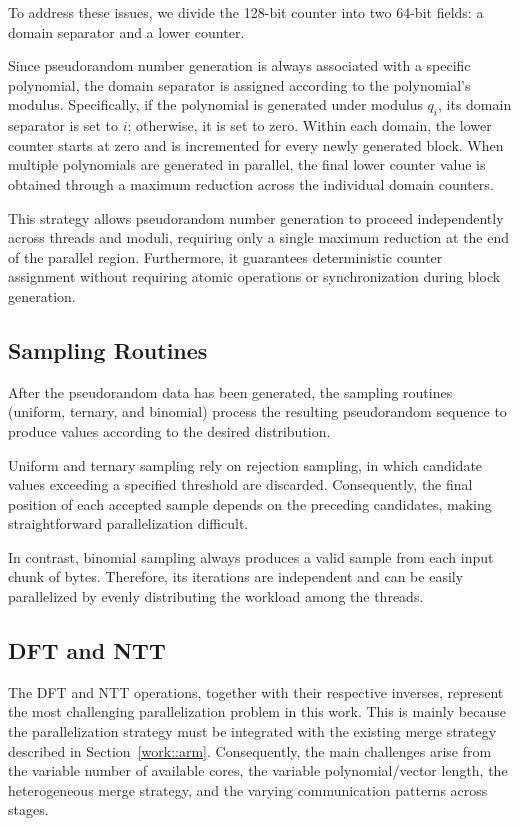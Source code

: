 To address these issues, we divide the 128-bit counter into two 64-bit fields: a domain separator and a lower counter.

Since pseudorandom number generation is always associated with a specific polynomial, the domain separator is assigned according to the polynomial's modulus. Specifically, if the polynomial is generated under modulus $q_i$, its domain separator is set to $i$; otherwise, it is set to zero. Within each domain, the lower counter starts at zero and is incremented for every newly generated block. When multiple polynomials are generated in parallel, the final lower counter value is obtained through a maximum reduction across the individual domain counters.

This strategy allows pseudorandom number generation to proceed independently across threads and moduli, requiring only a single maximum reduction at the end of the parallel region. Furthermore, it guarantees deterministic counter assignment without requiring atomic operations or synchronization during block generation.

\subsection{Sampling Routines}

After the pseudorandom data has been generated, the sampling routines (uniform, ternary, and binomial) process the resulting pseudorandom sequence to produce values according to the desired distribution.

Uniform and ternary sampling rely on rejection sampling, in which candidate values exceeding a specified threshold are discarded. Consequently, the final position of each accepted sample depends on the preceding candidates, making straightforward parallelization difficult.

In contrast, binomial sampling always produces a valid sample from each input chunk of bytes. Therefore, its iterations are independent and can be easily parallelized by evenly distributing the workload among the threads.

\subsection{DFT and NTT}

The DFT and NTT operations, together with their respective inverses, represent the most challenging parallelization problem in this work. This is mainly because the parallelization strategy must be integrated with the existing merge strategy described in Section~\ref{work::arm}. Consequently, the main challenges arise from the variable number of available cores, the variable polynomial/vector length, the heterogeneous merge strategy, and the varying communication patterns across stages.

